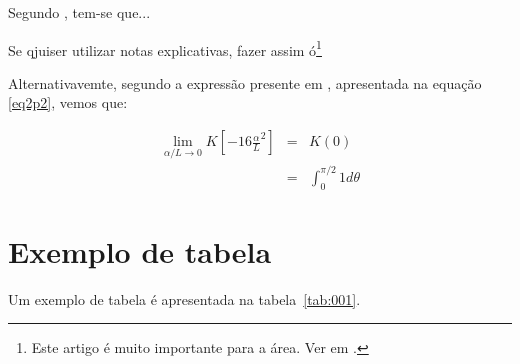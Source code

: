 \documentclass[
	12pt,				%
	openright,			%
	oneside,			%
	a4paper,			%
	english,			%
	brazil				%
	]{abntex2}
\begin{document}
Segundo \cite{lima2025}, tem-se que...

Se qjuiser utilizar notas explicativas, fazer assim ó\footnote{Este artigo é muito importante para a área. Ver em \textcite[p.4]{lima2025}.}

Alternativavemte, segundo a expressão presente em \textcite[p.~3]{lima2025}, apresentada na equação \eqref{eq2p2}, vemos que:

\begin{eqnarray}
	\lim_{\alpha / L \to 0} K  \left[-16 {{\frac{\alpha}{L}}^{2}}\right]  &=& K(0) \label{eq2p1} \nonumber \\ %
	&=& \int_{0}^{\pi / 2} 1 d\theta \label{eq2p2}
\end{eqnarray}

\section{Exemplo de tabela}

Um exemplo de tabela é apresentada na tabela~\ref{tab:001}. 
\end{document}
